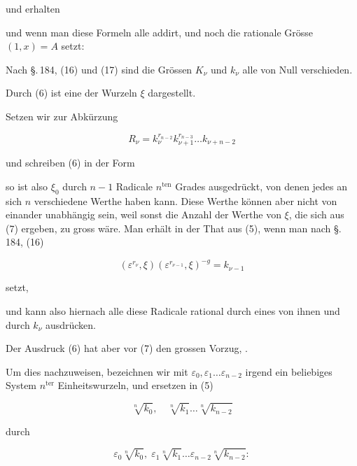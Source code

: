 
und erhalten


und wenn man diese Formeln alle addirt, und noch die rationale Grösse $(1, x) = A$ setzt:


Nach \S.\,184, (16) und (17) sind die Grössen $K_\nu$ und $k_\nu$ alle von Null verschieden.

Durch (6) ist eine der Wurzeln $\xi$ dargestellt.

Setzen wir zur Abkürzung

\[
R_\nu = k_\nu^{r_{n-2}} k_{\nu+1}^{r_{n-3}} \ldots k_{\nu+n-2}
\]

und schreiben (6) in der Form


so ist also $\xi_0$ durch $n-1$ Radicale $n^{\mathrm{ten}}$ Grades ausgedrückt, von denen jedes an sich $n$ verschiedene Werthe haben kann. Diese Werthe können aber nicht von einander unabhängig sein, weil sonst die Anzahl der Werthe von $\xi$, die sich aus (7) ergeben, zu gross wäre. Man erhält in der That aus (5), wenn man nach \S.\,184, (16)

\[
(\varepsilon^{r_\nu}, \xi) (\varepsilon^{r_{\nu-1}}, \xi)^{-g} = k_{\nu-1}
\]

setzt,


und kann also hiernach alle diese Radicale rational durch eines von ihnen und durch $k_\nu$ ausdrücken.

Der Ausdruck (6) hat aber vor (7) den grossen Vorzug, .

Um dies nachzuweisen, bezeichnen wir mit $\varepsilon_0, \varepsilon_1 \ldots \varepsilon_{n-2}$ irgend ein beliebiges System $n^{\mathrm{ter}}$ Einheitswurzeln, und ersetzen in (5)

\[
\sqrt[n]{k_0}, \quad \sqrt[n]{k_1} \ldots \sqrt[n]{k_{n-2}}
\]

durch

\[
\varepsilon_0 \sqrt[n]{k_0}, \; \varepsilon_1 \sqrt[n]{k_1} \ldots \varepsilon_{n-2} \sqrt[n]{k_{n-2}}:
\]
